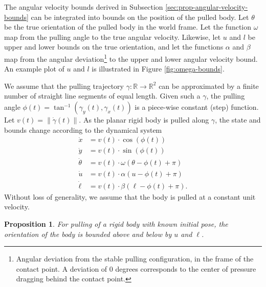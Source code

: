 \documentclass[conference]{IEEEtran}
\newtheorem{proposition}{Proposition}
\begin{document}
The angular velocity bounds derived in Subsection
\ref{sec:prop-angular-velocity-bounds} can be integrated into bounds
on the position of the pulled body.  Let $\theta$ be the true
orientation of the pulled body in the world frame. Let the function
$\omega$ map from the pulling angle to the true angular
velocity. Likewise, let $u$ and $l$ be upper and lower bounds on the
true orientation, and let the functions $\alpha$ and $\beta$ map from
the angular deviation\footnote{Angular deviation from the stable
  pulling configuration, in the frame of the contact point. A
  deviation of 0 degrees corresponds to the center of pressure
  dragging behind the contact point.} to the upper and lower angular
velocity bound. An example plot of $u$ and $l$ is illustrated in
Figure \ref{fig:omega-bounds}.

We assume that the pulling trajectory
$\gamma:\mathbb{R}\rightarrow\mathbb{R}^2$ can be approximated by a
finite number of straight line segments of equal length. Given such a
$\gamma$, the pulling angle
$\phi(t) = \tan^{-1}(\gamma_y(t),\gamma_x(t))$ is a piece-wise
constant (step) function. Let $v(t) = \lVert\dot{\gamma}(t)\rVert$. As
the planar rigid body is pulled along $\gamma$, the state and bounds
change according to the dynamical system
\begin{align}
  \dot{x} &= v(t)\cdot\cos(\phi(t))\\
  \dot{y} &= v(t)\cdot\sin(\phi(t))\\
  \dot{\theta} &= v(t)\cdot\omega(\theta - \phi(t) + \pi)\\
  \dot{u} &=  v(t)\cdot\alpha(u - \phi(t) + \pi) \label{eq:u-ode}\\ 
  \dot{\ell} &=  v(t)\cdot\beta(\ell - \phi(t) + \pi). 
\end{align}
Without loss of generality, we assume that the body is pulled at a
constant unit velocity.

\begin{proposition}
  For pulling of a rigid body with known initial pose, the orientation
  of the body is bounded above and below by $u$ and $\ell$.
\end{proposition}
\end{document}
